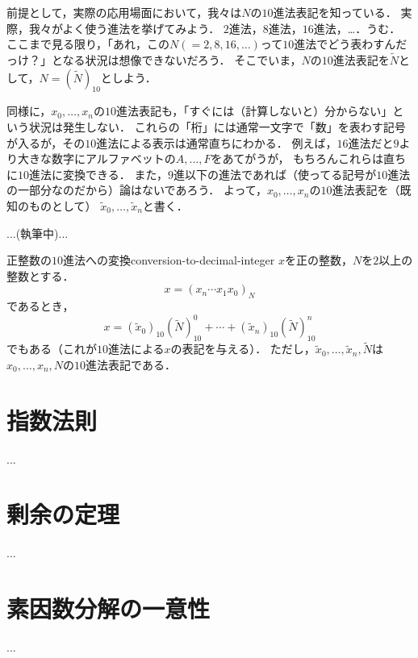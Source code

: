 \documentclass[a5j, uplatex, dvipdfmx]{jsbook}
\begin{document}
    前提として，実際の応用場面において，我々は$N$の$10$進法表記を知っている．
    実際，我々がよく使う進法を挙げてみよう．
    $2$進法，$8$進法，$16$進法，…．うむ．
    ここまで見る限り，「あれ，この$N(=2,8,16,\dots)$って$10$進法でどう表わすんだっけ？」となる状況は想像できないだろう．
    そこでいま，$N$の$10$進法表記を$\tilde{N}$として，$N = (\tilde{N})_{10}$としよう．

    同様に，$x_0, \dots, x_n$の$10$進法表記も，「すぐには（計算しないと）分からない」という状況は発生しない．
    これらの「桁」には通常一文字で「数」を表わす記号が入るが，その$10$進法による表示は通常直ちにわかる．
    例えば，$16$進法だと$9$より大きな数字にアルファベットの$A, \dots, F$をあてがうが，
    もちろんこれらは直ちに$10$進法に変換できる．
    また，$9$進以下の進法であれば（使ってる記号が$10$進法の一部分なのだから）論はないであろう．
    よって，$x_0, \dots, x_n$の$10$進法表記を（既知のものとして）
    $\tilde{x}_0, \dots, \tilde{x}_n$と書く．

    ...(執筆中)...

    \begin{thm}{正整数の$10$進法への変換}{conversion-to-decimal-integer}
        $x$を正の整数，$N$を$2$以上の整数とする．
        \begin{equation*}
            x = (x_n \cdots x_1 x_0)_N
        \end{equation*}
        であるとき，
        \begin{equation*}
            x = (\tilde{x}_0)_{10}(\tilde{N})_{10}^0 + \cdots + (\tilde{x}_n)_{10}(\tilde{N})_{10}^n
        \end{equation*}
        でもある（これが$10$進法による$x$の表記を与える）．
        ただし，$\tilde{x}_0, \dots, \tilde{x}_n, \tilde{N}$は
        $x_0, \dots, x_n, N$の$10$進法表記である．
    \end{thm}

\appendix
\chapter{指数法則}
    ...

\chapter{剰余の定理}
    ...

\chapter{素因数分解の一意性}
    ...
\end{document}
